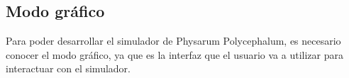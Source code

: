 \subsection{Modo gr\'afico}
\label{sec:ModoGrafico}
    Para poder desarrollar el simulador de Physarum Polycephalum, es necesario conocer el modo gr\'afico, 
        ya que es la interfaz que el usuario va a utilizar para interactuar con el simulador.
    \vskip 0.5cm
    
